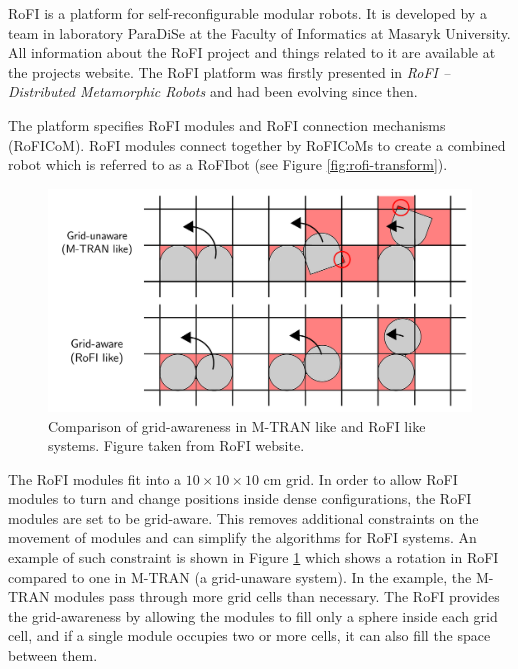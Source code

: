 \documentclass[
  printed, %
  color,   %
  notable, %
  oneside, %
  nolof,   %
  nolot,   %
  nocover,
]{fithesis3}
\begin{document}
RoFI is a platform for self-reconfigurable modular robots.
It is developed by a team in laboratory ParaDiSe\cite{paradise-web} at the Faculty of Informatics at Masaryk University.
All information about the RoFI project and things related to it are available at the projects website.\cite{rofi-web}
The RoFI platform was firstly presented in \emph{RoFI -- Distributed Metamorphic Robots}\cite{rofi-thesis} and had been evolving since then.

The platform specifies RoFI modules and RoFI connection mechanisms (RoFICoM).
RoFI modules connect together by RoFICoMs to create a combined robot which is referred to as a RoFIbot\label{rofibot} (see Figure \ref{fig:rofi-transform}).

\begin{figure}
    \centering
    \includegraphics[width=\linewidth]{data/grid_aware.pdf}
    \caption{Comparison of grid-awareness in M-TRAN like and RoFI like systems. Figure taken from RoFI website\cite{rofi-web}.}
    \label{fig:grid-aware}
\end{figure}

The RoFI modules fit into a $10 \times 10 \times 10$ cm grid.
In order to allow RoFI modules to turn and change positions inside dense configurations, the RoFI modules are set to be grid-aware.
This removes additional constraints on the movement of modules and can simplify the algorithms for RoFI systems.
An example of such constraint is shown in Figure \ref{fig:grid-aware} which shows a rotation in RoFI compared to one in M-TRAN\cite{mtran} (a grid-unaware system).
In the example, the M-TRAN modules pass through more grid cells than necessary.
The RoFI provides the grid-awareness by allowing the modules to fill only a sphere inside each grid cell, and if a single module occupies two or more cells, it can also fill the space between them.
\end{document}
